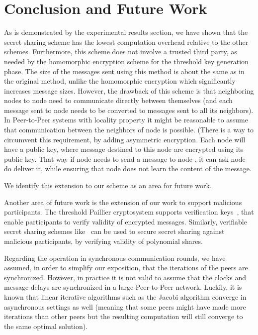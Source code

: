 \documentclass[times, 10pt,twocolumn]{article}
\begin{document}
\section{Conclusion and Future Work}
\label{Conclusion} As is demonstrated by the experimental results
section, we have shown that the secret sharing scheme has the lowest computation
overhead relative to the other schemes. Furthermore, this scheme does not
involve a trusted third party, as needed by the homomorphic
encryption scheme for the threshold key generation phase. The
size of the messages sent using this method is about the same as in
the original method,
unlike the homomorphic encryption which significantly increases
message sizes. However, the  drawback of this scheme is that
neighboring nodes to node  need to communicate directly between
themselves (and each message sent to node  needs to be converted to
messages sent to all its neighbors). In Peer-to-Peer systems with locality property it
might be reasonable to assume that communication between the neighbors
of node  is possible.
(There is a way to circumvent this requirement, by adding
asymmetric encryption. Each node will have a public key, where
message destined to this node are encrypted using its public key.
That way if node  needs to send a message to node , it can ask
node  do deliver it, while ensuring that node  does not learn
the  content of the message.
We identify this
extension to our scheme as an area for future work.

Another area of future work is the extension of our work to
support malicious participants. The threshold Paillier
cryptosystem supports verification keys~\cite{Paillier2}, that
enable participants  to verify validity of encrypted messages.
Similarly, verifiable secret sharing schemes
like~\cite{ProactiveSS} can be used to secure secret sharing
against malicious participants, by verifying validity of
polynomial shares.

Regarding the operation in synchronous communication rounds, we
have assumed,  in order to simplify our exposition, that the
iterations of the peers are synchronized.
However, in practice it is not  valid to assume  that the clocks and message delays are synchronized in
a large Peer-to-Peer network. Luckily, it is known that linear
iterative algorithms such as the Jacobi algorithm
converge in asynchronous settings as well (meaning  that some
peers might have made more iterations than other peers but the
resulting computation will still converge to the same optimal
solution).



\end{document}
